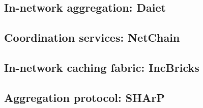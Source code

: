 

\subsection{In-network aggregation: Daiet \texorpdfstring{\cite{daiet}}{}}


\subsection{Coordination services: NetChain \texorpdfstring{\cite{netchain}}{}}


\subsection{In-network caching fabric: IncBricks \texorpdfstring{\cite{incbricks}}{}}


\subsection{Aggregation protocol: SHArP \texorpdfstring{\cite{sharp}}{}}
